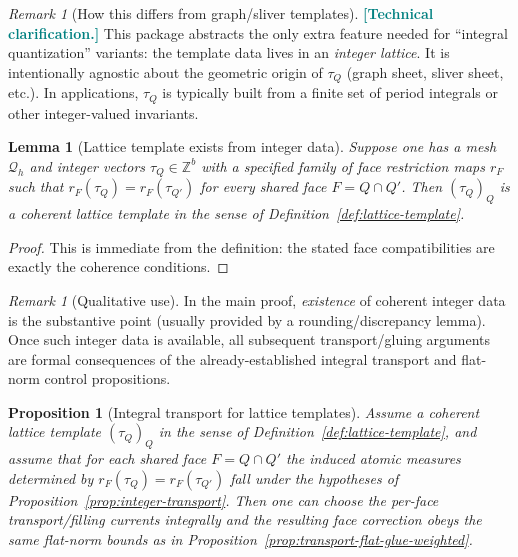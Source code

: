 \documentclass[11pt]{article}
\newcommand{\REVMZ}[1]{\textcolor{teal}{#1}}  %
\numberwithin{equation}{section}  %
\theoremstyle{plain}
\newtheorem{lemma}[theorem]{Lemma}
\newtheorem{proposition}[theorem]{Proposition}
\theoremstyle{definition}
\theoremstyle{remark}
\newtheorem{remark}[theorem]{Remark}
\newcommand{\Z}{\mathbb{Z}}
\begin{document}
%
\begin{remark}[How this differs from graph/sliver templates]\label{rem:lattice-template-remark}
\REVMZ{\textbf{[Technical clarification.]}}
This package abstracts the only extra feature needed for ``integral quantization'' variants: the template data lives in an \emph{integer lattice}.
It is intentionally agnostic about the geometric origin of $\tau_Q$ (graph sheet, sliver sheet, etc.).
In applications, $\tau_Q$ is typically built from a finite set of period integrals or other integer-valued invariants.
\end{remark}


%
\begin{lemma}[Lattice template exists from integer data]\label{lem:lattice-template-exists}
Suppose one has a mesh $\mathcal Q_h$ and integer vectors $\tau_Q\in\Z^b$ with a specified family of face restriction maps $r_F$
such that $r_F(\tau_Q)=r_F(\tau_{Q'})$ for every shared face $F=Q\cap Q'$.
Then $(\tau_Q)_Q$ is a coherent lattice template in the sense of Definition~\ref{def:lattice-template}.
\end{lemma}

\begin{proof}
This is immediate from the definition: the stated face compatibilities are exactly the coherence conditions.
\end{proof}

%
\begin{remark}[Qualitative use]\label{rem:lattice-template-qualitative}
In the main proof, \emph{existence} of coherent integer data is the substantive point (usually provided by a rounding/discrepancy lemma).
Once such integer data is available, all subsequent transport/gluing arguments are formal consequences of the already-established
integral transport and flat-norm control propositions.
\end{remark}


%
\begin{proposition}[Integral transport for lattice templates]\label{prop:lattice-template-transport}
Assume a coherent lattice template $(\tau_Q)_Q$ in the sense of Definition~\ref{def:lattice-template}, and assume that for each shared face
$F=Q\cap Q'$ the induced atomic measures determined by $r_F(\tau_Q)=r_F(\tau_{Q'})$ fall under the hypotheses of
Proposition~\ref{prop:integer-transport}.  Then one can choose the per-face transport/filling currents integrally and the resulting face
correction obeys the same flat-norm bounds as in Proposition~\ref{prop:transport-flat-glue-weighted}.
\end{proposition}
\end{document}
